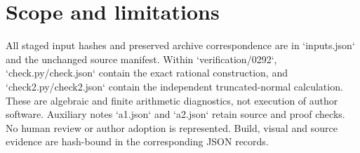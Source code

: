 \documentclass[10pt]{article}
\begin{document}
\section*{Scope and limitations}
All staged input hashes and preserved archive correspondence are in `inputs.json` and the unchanged source manifest. Within `verification/0292`, `check.py/check.json` contain the exact rational construction, and `check2.py/check2.json` contain the independent truncated-normal calculation. These are algebraic and finite arithmetic diagnostics, not execution of author software. Auxiliary notes `a1.json` and `a2.json` retain source and proof checks. No human review or author adoption is represented. Build, visual and source evidence are hash-bound in the corresponding JSON records.\par
\end{document}
